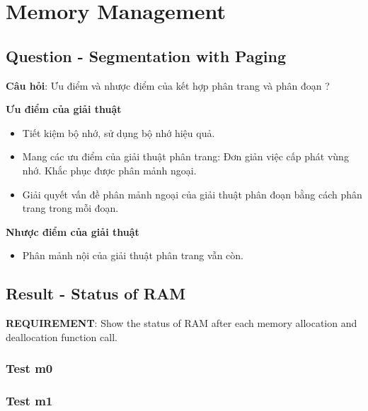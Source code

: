 
\section{Memory Management}

\subsection{Question - Segmentation with Paging}

\vspace{0.3cm}

\textbf{Câu hỏi}: Ưu điểm và nhược điểm của kết hợp phân trang và phân đoạn ?

\vspace{0.3cm}

\textbf{Ưu điểm của giải thuật}

\begin{itemize}
	\item Tiết kiệm bộ nhớ, sử dụng bộ nhớ hiệu quả.
	\item Mang các ưu điểm của giải thuật phân trang:
	\subitem Đơn giản việc cấp phát vùng nhớ.
	\subitem Khắc phục được phân mảnh ngoại.
	\item Giải quyết vấn đề phân mảnh ngoại của giải thuật phân đoạn bằng cách phân trang trong mỗi đoạn.
\end{itemize}

\vspace{0.3cm}

\textbf{Nhược điểm của giải thuật}

\begin{itemize}
	\item Phân mảnh nội của giải thuật phân trang vẫn còn.
\end{itemize}

\subsection{Result - Status of RAM}

\vspace{0.2cm}

\textbf{REQUIREMENT}: Show the status of RAM after each memory allocation and deallocation function call.

\subsubsection*{Test m0}


\subsubsection*{Test m1}


